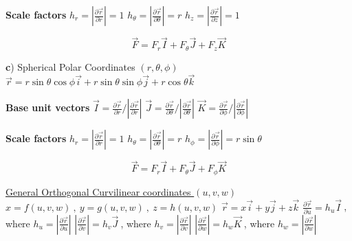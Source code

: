 \documentclass[12pt]{article}
\begin{document}
\begin{flushleft}
	\textbf{Scale factors} \linebreak 
	$\displaystyle h_r = \left| \frac{\partial \vec{r}}{\partial r} \right| = 1$ \linebreak 
	$\displaystyle h_{\theta} = \left| \frac{\partial \vec{r}}{\partial \theta} \right| = r$ \linebreak 
	$\displaystyle h_z = \left| \frac{\partial \vec{r}}{\partial z} \right| = 1$ \linebreak 
	
	$$ \vec{F} = F_r \vec{I} + F_{\theta} \vec{J} + F_z \vec{K} $$
	
	\textbf{c}) Spherical Polar Coordinates $(r,\theta, \phi)$ \linebreak 
	$\displaystyle \vec{r} = r \sin \theta \cos \phi \vec{i} + r \sin \theta \sin \phi \vec{j} + r \cos \theta \vec{k}$ \linebreak 
	
	\textbf{Base unit vectors} \linebreak 
	$\displaystyle \vec{I} = \frac{\partial \vec{r}}{\partial r} \big/ \left| \frac{\partial \vec{r}}{\partial r} \right| $ \linebreak 
	$\displaystyle \vec{J} = \frac{\partial \vec{r}}{\partial \theta} \big/ \left| \frac{\partial \vec{r}}{\partial \theta} \right| $ \linebreak 
	$\displaystyle \vec{K} = \frac{\partial \vec{r}}{\partial \phi} \big/ \left| \frac{\partial \vec{r}}{\partial \phi} \right| $ \linebreak 

	\textbf{Scale factors} \linebreak 
	$\displaystyle h_r = \left| \frac{\partial \vec{r}}{\partial r} \right| = 1 $ \linebreak 
	$\displaystyle h_{\theta} = \left| \frac{\partial \vec{r}}{\partial \theta} \right| = r $ \linebreak 
	$\displaystyle h_{\phi} = \left| \frac{\partial \vec{r}}{\partial \phi} \right| = r\sin \theta $ \linebreak 
	
	$$ \vec{F} = F_r \vec{I} + F_{\theta} \vec{J} + F_{\phi} \vec{K} $$
	
	\textbullet \quad \uline{General Orthogonal Curvilinear coordinates $(u,v,w)$} \linebreak 
	$\displaystyle x = f(u,v,w) \ , \ y = g(u,v,w) \ , \ z = h(u,v,w) $ \linebreak 
	$\displaystyle \vec{r} = x \vec{i} + y \vec{j} + z \vec{k} $ \linebreak 
	$\displaystyle \frac{\partial \vec{r}}{\partial u} = h_u \vec{I} \ $, where $\displaystyle h_u = \left| \frac{\partial \vec{r}}{\partial u} \right| $ \linebreak 
	$\displaystyle \left| \frac{\partial \vec{r}}{\partial v} \right| = h_v \vec{J} \ $, where $\displaystyle h_v = \left| \frac{\partial \vec{r}}{\partial v} \right| $ \linebreak 
	$\displaystyle \left| \frac{\partial \vec{r}}{\partial w} \right| = h_w \vec{K} \ $, where $\displaystyle h_w = \left| \frac{\partial \vec{r}}{\partial w} \right| $ \linebreak 
	

\end{flushleft}
\end{document}
